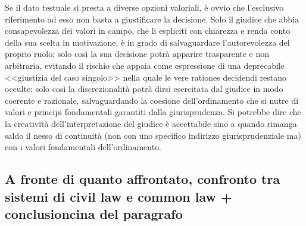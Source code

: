 Se il dato testuale si presta a diverse opzioni valoriali, è ovvio che l'esclusivo riferimento ad esso non basta a giustificare la decisione. Solo il giudice che abbia consapevolezza dei valori in campo, che li espliciti con chiarezza e renda conto della sua scelta in motivazione, è in grado di salvaguardare l'autorevolezza del proprio ruolo; solo così la sua decisione potrà apparire trasparente e non arbitraria, evitando il rischio che appaia come espressione di una deprecabile <<giustizia del caso singolo>> nella quale le vere rationes decidendi restano occulte; solo così la discrezionalità potrà dirsi esercitata dal giudice in modo coerente e razionale, salvaguardando la coesione dell'ordinamento che si nutre di valori e principi fondamentali garantiti dalla giurisprudenza. Si potrebbe dire che la creatività dell'interpretazione del giudice è accettabile sino a quando rimanga saldo il nesso di continuità (non con uno specifico indirizzo giurisprudenziale ma) con i valori fondamentali dell'ordinamento.

\subsection{A fronte di quanto affrontato, confronto tra sistemi di civil law e common law + conclusioncina del paragrafo}

